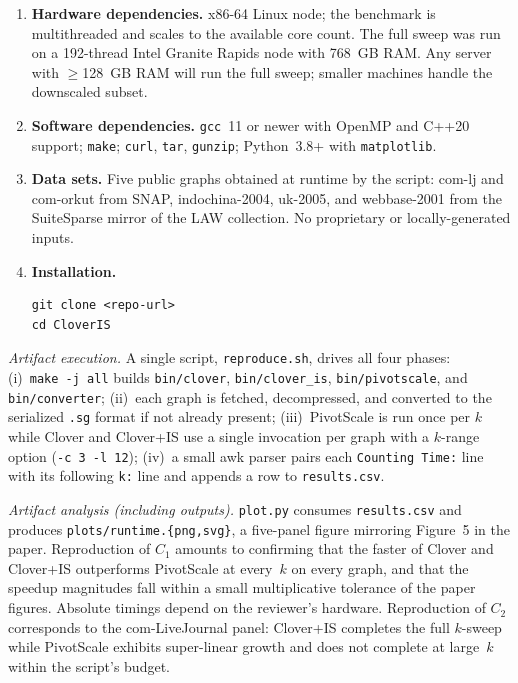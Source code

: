 \begin{enumerate}
    \item \textbf{Hardware dependencies.} x86-64 Linux node; the
    benchmark is multithreaded and scales to the available core count.
    The full sweep was run on a 192-thread Intel Granite Rapids node
    with 768~GB RAM. Any server with $\geq$128~GB RAM will run the full
    sweep; smaller machines handle the downscaled subset.
    \item \textbf{Software dependencies.} \texttt{gcc}~11 or newer with
    OpenMP and C++20 support; \texttt{make}; \texttt{curl},
    \texttt{tar}, \texttt{gunzip}; Python~3.8+ with \texttt{matplotlib}.
    \item \textbf{Data sets.} Five public graphs obtained at runtime by
    the script: \textsf{com-lj} and \textsf{com-orkut} from SNAP,
    \textsf{indochina-2004}, \textsf{uk-2005}, and \textsf{webbase-2001}
    from the SuiteSparse mirror of the LAW collection. No proprietary or
    locally-generated inputs.
    \item \textbf{Installation.}
\begin{verbatim}
git clone <repo-url>
cd CloverIS
\end{verbatim}
\end{enumerate}

\noindent\emph{Artifact execution.}
A single script, \texttt{reproduce.sh}, drives all four phases:
(i)~\texttt{make~-j all} builds \texttt{bin/clover}, \texttt{bin/clover\_is},
\texttt{bin/pivotscale}, and \texttt{bin/converter}; (ii)~each graph is
fetched, decompressed, and converted to the serialized \texttt{.sg} format
if not already present; (iii)~\textsf{PivotScale} is run once per $k$
while \textsf{Clover} and \textsf{Clover+IS} use a single invocation per
graph with a $k$-range option (\texttt{-c 3 -l 12}); (iv)~a small awk
parser pairs each \texttt{Counting Time:} line with its following
\texttt{k:} line and appends a row to \texttt{results.csv}.

\noindent\emph{Artifact analysis (including outputs).}
\texttt{plot.py} consumes \texttt{results.csv} and produces
\texttt{plots/runtime.\{png,svg\}}, a five-panel figure mirroring
Figure~5 in the paper. Reproduction of $C_1$ amounts to confirming that
the faster of \textsf{Clover} and \textsf{Clover+IS} outperforms
\textsf{PivotScale} at every~$k$ on every graph, and that the
speedup magnitudes fall within a small multiplicative tolerance of the
paper figures. Absolute timings depend on the reviewer's hardware.
Reproduction of $C_2$ corresponds to the \textsf{com-LiveJournal} panel:
\textsf{Clover+IS} completes the full $k$-sweep while \textsf{PivotScale}
exhibits super-linear growth and does not complete at large~$k$ within
the script's budget.

